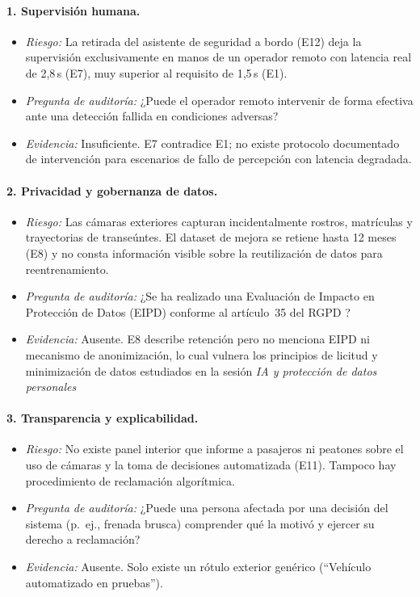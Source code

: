 \documentclass[11pt]{article}
\begin{document}
\paragraph{1. Supervisión humana.}
\begin{itemize}[nosep]
    \item \textit{Riesgo:} La retirada del asistente de seguridad a bordo (E12) deja la supervisión exclusivamente en manos de un operador remoto con latencia real de 2,8\,s (E7), muy superior al requisito de 1,5\,s (E1).
    \item \textit{Pregunta de auditoría:} ¿Puede el operador remoto intervenir de forma efectiva ante una detección fallida en condiciones adversas?
    \item \textit{Evidencia:} Insuficiente. E7 contradice E1; no existe protocolo documentado de intervención para escenarios de fallo de percepción con latencia degradada.
\end{itemize}

\paragraph{2. Privacidad y gobernanza de datos.}
\begin{itemize}[nosep]
    \item \textit{Riesgo:} Las cámaras exteriores capturan incidentalmente rostros, matrículas y trayectorias de transeúntes. El dataset de mejora se retiene hasta 12 meses (E8) y no consta información visible sobre la reutilización de datos para reentrenamiento.
    \item \textit{Pregunta de auditoría:} ¿Se ha realizado una Evaluación de Impacto en Protección de Datos (EIPD) conforme al artículo~35 del RGPD \parencite{eu2016rgpd}?
    \item \textit{Evidencia:} Ausente. E8 describe retención pero no menciona EIPD ni mecanismo de anonimización, lo cual vulnera los principios de licitud y minimización de datos estudiados en la sesión \textit{IA y protección de datos personales}
\end{itemize}

\paragraph{3. Transparencia y explicabilidad.}
\begin{itemize}[nosep]
    \item \textit{Riesgo:} No existe panel interior que informe a pasajeros ni peatones sobre el uso de cámaras y la toma de decisiones automatizada (E11). Tampoco hay procedimiento de reclamación algorítmica.
    \item \textit{Pregunta de auditoría:} ¿Puede una persona afectada por una decisión del sistema (p.~ej., frenada brusca) comprender qué la motivó y ejercer su derecho a reclamación?
    \item \textit{Evidencia:} Ausente. Solo existe un rótulo exterior genérico (``Vehículo automatizado en pruebas'').
\end{itemize}
\end{document}
